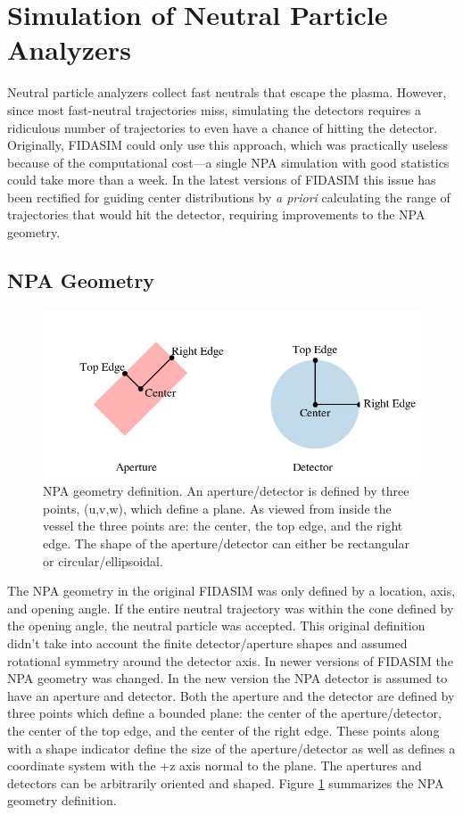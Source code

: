 \section{Simulation of Neutral Particle Analyzers}
Neutral particle analyzers collect fast neutrals that escape the plasma. However, since most fast-neutral trajectories miss, simulating the detectors requires a ridiculous number of trajectories to even have a chance of hitting the detector. Originally, FIDASIM could only use this approach, which was practically useless because of the computational cost---a single NPA simulation with good statistics could take more than a week. In the latest versions of FIDASIM this issue has been rectified for guiding center distributions by \textit{a priori} calculating the range of trajectories that would hit the detector, requiring improvements to the NPA geometry.

\subsection{NPA Geometry}
\begin{figure}[h!]
    \centering
    \includegraphics[width=15cm]{figures/npa_geom.jpg}
    \caption{NPA geometry definition. An aperture/detector is defined by three points, (u,v,w), which define a plane. As viewed from inside the vessel the three points are: the center, the top edge, and the right edge. The shape of the aperture/detector can either be rectangular or circular/ellipsoidal.}
    \label{fig:npa_geom}
\end{figure}
The NPA geometry in the original FIDASIM was only defined by a location, axis, and opening angle. If the entire neutral trajectory was within the cone defined by the opening angle, the neutral particle was accepted. This original definition didn't take into account the finite detector/aperture shapes and assumed rotational symmetry around the detector axis.
In newer versions of FIDASIM the NPA geometry was changed. In the new version the NPA detector is assumed to have an aperture and detector. Both the aperture and the detector are defined by three points which define a bounded plane: the center of the aperture/detector, the center of the top edge, and the center of the right edge. These points along with a shape indicator define the size of the aperture/detector as well as defines a coordinate system with the +z axis normal to the plane. The apertures and detectors can be arbitrarily oriented and shaped. Figure \ref{fig:npa_geom} summarizes the NPA geometry definition.

